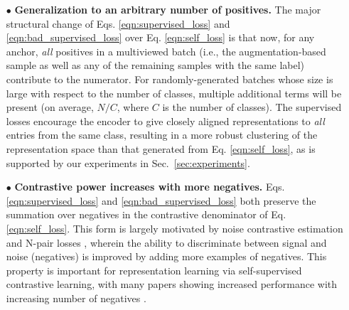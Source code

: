 \begin{itemize}[leftmargin=*]
  \item[$\bullet$] \textbf{Generalization to an arbitrary number of positives.} The major structural change of Eqs. \ref{eqn:supervised_loss} and \ref{eqn:bad_supervised_loss} over Eq. \ref{eqn:self_loss} is that now, for any anchor, \emph{all} positives in a multiviewed batch (i.e., the augmentation-based sample as well as any of the remaining samples with the same label) contribute to the numerator. For randomly-generated batches whose size is large with respect to the number of classes, multiple additional terms will be present (on average, $N/C$, where $C$ is the number of classes). The supervised losses encourage the encoder to give closely aligned representations to \emph{all} entries from the same class, resulting in a more robust clustering of the representation space than that generated from Eq. \ref{eqn:self_loss}, as is supported by our experiments in Sec.~\ref{sec:experiments}. \fi

  \item[$\bullet$] \textbf{Contrastive power increases with more negatives.} Eqs. \ref{eqn:supervised_loss} and \ref{eqn:bad_supervised_loss} both preserve the summation over negatives in the contrastive denominator of Eq. \ref{eqn:self_loss}. This form is largely motivated by noise contrastive estimation and N-pair losses \cite{gutmann2010noise,sohn2016improved}, wherein the ability to discriminate between signal and noise (negatives) is improved by adding more examples of negatives. This property is important for representation learning via self-supervised contrastive learning, with many papers showing increased performance with increasing number of negatives \cite{henaff2019data,he2019momentum,tian2019contrastive,chen2020simple}.


\end{itemize}
